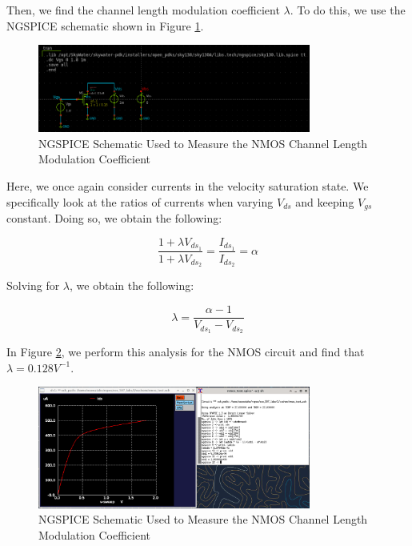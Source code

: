 \documentclass{article}
\begin{document}
	Then, we find the channel length modulation coefficient $\lambda$. To do this, we use the NGSPICE schematic shown in Figure \ref{fig::nmos_lambda_meas_schem}.
	
	\begin{figure}[H]
		\centerline{\includegraphics[width=0.8\textwidth]{nmos_vt_meas_schem.png}}
		\caption{NGSPICE Schematic Used to Measure the NMOS Channel Length Modulation Coefficient}
		\label{fig::nmos_lambda_meas_schem}
	\end{figure}
	
	\noindent Here, we once again consider currents in the velocity saturation state. We specifically look at the ratios of currents when varying $V_{ds}$ and keeping $V_{gs}$ constant. Doing so, we obtain the following:
	
	\begin{equation}
		\frac{1 + {\lambda}V_{ds_1}}{1 + {\lambda}V_{ds_2}} = \frac{I_{ds_1}}{I_{ds_2}} = \alpha
	\end{equation}
	
	\noindent Solving for $\lambda$, we obtain the following:
	
	\begin{equation}
		\lambda = \frac{\alpha - 1}{V_{ds_1} - V_{ds_2}}
	\end{equation}
	
	\noindent In Figure \ref{fig::nmos_lambda_meas}, we perform this analysis for the NMOS circuit and find that $\lambda = 0.128 V^{-1}$.
	
	\begin{figure}[H]
		\centerline{\includegraphics[width=0.8\textwidth]{nmos_lambda_meas.png}}
		\caption{NGSPICE Schematic Used to Measure the NMOS Channel Length Modulation Coefficient}
		\label{fig::nmos_lambda_meas}
	\end{figure}
	
\end{document}
